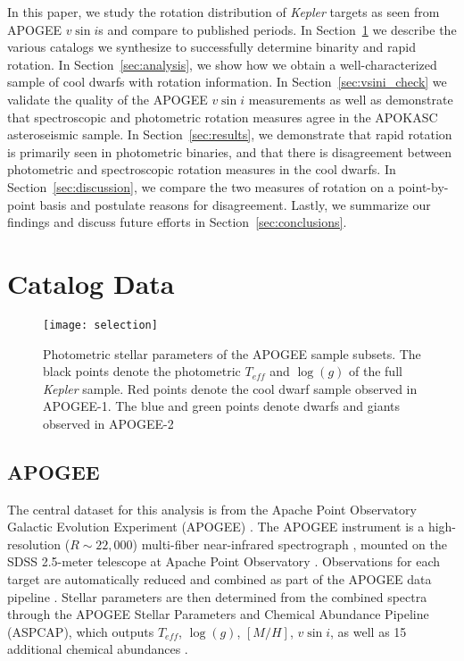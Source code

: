 \documentclass[manuscript]{aastex6}
\newcommand{\vsini}{\ensuremath{v \sin i}}
\newcommand{\Kepler}{\mbox{\textit{Kepler}}}
\newcommand{\Teff}{\ensuremath{T_{eff}}}
\newcommand{\logg}{\ensuremath{\log(g)}}
\begin{document}
In this paper, we study the rotation distribution of \Kepler{} targets as
seen from APOGEE \vsini{}s and compare to published periods. In 
Section~\ref{sec:data} we describe the various catalogs we synthesize to
successfully determine binarity and rapid rotation.
In Section~\ref{sec:analysis}, we show how we obtain a well-characterized
sample of cool dwarfs with rotation information. In
Section~\ref{sec:vsini_check} we validate the quality of the APOGEE \vsini{}
measurements as well as demonstrate that spectroscopic and photometric rotation
measures agree in the 
APOKASC asteroseismic sample. In Section~\ref{sec:results}, we demonstrate that
rapid rotation is primarily seen in photometric binaries, and that there is
disagreement between photometric and spectroscopic rotation measures in the
cool dwarfs. In Section~\ref{sec:discussion}, we compare the two measures of 
rotation on a point-by-point basis and postulate reasons for disagreement. 
Lastly, we summarize our findings and discuss future efforts in 
Section~\ref{sec:conclusions}.

\section{Catalog Data}
\label{sec:data}

\begin{figure}[htb]
    \centering
    \texttt{[image: selection]}
    \caption{Photometric stellar parameters of the APOGEE sample subsets. The
    black points denote the photometric \Teff{} and \logg{} of the full
\Kepler{} sample. Red points denote the cool dwarf sample observed in APOGEE-1.
The blue and green points denote dwarfs and giants observed in APOGEE-2}
    \label{fig:selection}
\end{figure}

\subsection{APOGEE}

The central dataset for this analysis is from the Apache Point Observatory 
Galactic Evolution Experiment (APOGEE) \citep{Blanton17,Majewski17}. The
APOGEE instrument is a high-resolution (\(R \sim 22,000\)) multi-fiber 
near-infrared spectrograph \citep{Wilson10}, mounted on the SDSS 2.5-meter 
telescope at Apache Point Observatory \citep{Gunn06}. Observations for each
target are automatically reduced and combined as part of the APOGEE data 
pipeline \citep{Nidever15}. Stellar parameters are then determined from the 
combined spectra through the APOGEE Stellar Parameters and Chemical Abundance 
Pipeline (ASPCAP), which outputs \Teff{}, \logg{}, \([M/H]\), \vsini{}, as 
well as 15 additional chemical abundances \citep{GarciaPerez16}.
\end{document}
